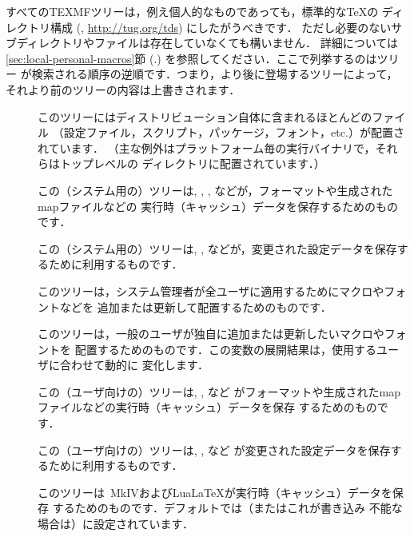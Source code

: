 \documentclass[uplatex,dvipdfmx]{jsarticle}
\begin{document}
すべてのTEXMFツリーは，例え個人的なものであっても，標準的な\TeX の
ディレクトリ構成 (\TDS, \url{http://tug.org/tds}) にしたがうべきです．
ただし必要のないサブディレクトリやファイルは存在していなくても構いません．
詳細については\ref{sec:local-personal-macros}節 (\p.\pageref{%
sec:local-personal-macros}) を参照してください．ここで列挙するのはツリー
が検索される順序の逆順です．つまり，より後に登場するツリーによって，
それより前のツリーの内容は上書きされます．
%
\begin{description}
\item[]
このツリーには\TL ディストリビューション自体に含まれるほとんどのファイル
（設定ファイル，スクリプト，パッケージ，フォント，etc.）が配置されています．
（主な例外はプラットフォーム毎の実行バイナリで，それらはトップレベルの
ディレクトリに配置されています．）

\item[]
この（システム用の）ツリーは, , , などが，フォーマットや生成されたmapファイルなどの
実行時（キャッシュ）データを保存するためのものです．

\item[]
この（システム用の）ツリーは, , などが，変更された設定データを保存するために利用するものです．

\item[]
このツリーは，システム管理者が全ユーザに適用するためにマクロやフォントなどを
追加または更新して配置するためのものです．

\item[]
このツリーは，一般のユーザが独自に追加または更新したいマクロやフォントを
配置するためのものです．この変数の展開結果は，使用するユーザに合わせて動的に
変化します．

\item[]
この（ユーザ向けの）ツリーは, , など
がフォーマットや生成されたmapファイルなどの実行時（キャッシュ）データを保存
するためのものです．

\item[]
この（ユーザ向けの）ツリーは, , など
が変更された設定データを保存するために利用するものです．

\item[]
このツリーは\ConTeXt\ MkIVおよびLua\LaTeX が実行時（キャッシュ）データを保存
するためのものです．デフォルトでは（またはこれが書き込み
不能な場合は）に設定されています．
\end{description}
\end{document}

